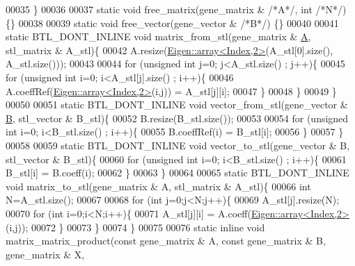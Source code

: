 \begin{DoxyCode}
00035   \}
00036 
00037   \textcolor{keyword}{static} \textcolor{keywordtype}{void} free\_matrix(gene\_matrix & \textcolor{comment}{/*A*/}, \textcolor{keywordtype}{int} \textcolor{comment}{/*N*/}) \{\}
00038 
00039   \textcolor{keyword}{static} \textcolor{keywordtype}{void} free\_vector(gene\_vector & \textcolor{comment}{/*B*/}) \{\}
00040 
00041   \textcolor{keyword}{static} BTL\_DONT\_INLINE \textcolor{keywordtype}{void} matrix\_from\_stl(gene\_matrix & \hyperlink{group___core___module_class_eigen_1_1_matrix}{A}, stl\_matrix & A\_stl)\{
00042     A.resize(\hyperlink{class_eigen_1_1array}{Eigen::array<Index,2>}(A\_stl[0].size(), A\_stl.size()));
00043 
00044     \textcolor{keywordflow}{for} (\textcolor{keywordtype}{unsigned} \textcolor{keywordtype}{int} j=0; j<A\_stl.size() ; j++)\{
00045       \textcolor{keywordflow}{for} (\textcolor{keywordtype}{unsigned} \textcolor{keywordtype}{int} i=0; i<A\_stl[j].size() ; i++)\{
00046         A.coeffRef(\hyperlink{class_eigen_1_1array}{Eigen::array<Index,2>}(i,j)) = A\_stl[j][i];
00047       \}
00048     \}
00049   \}
00050 
00051   \textcolor{keyword}{static} BTL\_DONT\_INLINE  \textcolor{keywordtype}{void} vector\_from\_stl(gene\_vector & \hyperlink{group___core___module_class_eigen_1_1_matrix}{B}, stl\_vector & B\_stl)\{
00052     B.resize(B\_stl.size());
00053 
00054     \textcolor{keywordflow}{for} (\textcolor{keywordtype}{unsigned} \textcolor{keywordtype}{int} i=0; i<B\_stl.size() ; i++)\{
00055       B.coeffRef(i) = B\_stl[i];
00056     \}
00057   \}
00058 
00059   \textcolor{keyword}{static} BTL\_DONT\_INLINE  \textcolor{keywordtype}{void} vector\_to\_stl(gene\_vector & B, stl\_vector & B\_stl)\{
00060     \textcolor{keywordflow}{for} (\textcolor{keywordtype}{unsigned} \textcolor{keywordtype}{int} i=0; i<B\_stl.size() ; i++)\{
00061       B\_stl[i] = B.coeff(i);
00062     \}
00063   \}
00064 
00065   \textcolor{keyword}{static} BTL\_DONT\_INLINE  \textcolor{keywordtype}{void} matrix\_to\_stl(gene\_matrix & A, stl\_matrix & A\_stl)\{
00066     \textcolor{keywordtype}{int}  N=A\_stl.size();
00067 
00068     \textcolor{keywordflow}{for} (\textcolor{keywordtype}{int} j=0;j<N;j++)\{
00069       A\_stl[j].resize(N);
00070       \textcolor{keywordflow}{for} (\textcolor{keywordtype}{int} i=0;i<N;i++)\{
00071         A\_stl[j][i] = A.coeff(\hyperlink{class_eigen_1_1array}{Eigen::array<Index,2>}(i,j));
00072       \}
00073     \}
00074   \}
00075 
00076   \textcolor{keyword}{static} \textcolor{keyword}{inline} \textcolor{keywordtype}{void} matrix\_matrix\_product(\textcolor{keyword}{const} gene\_matrix & A, \textcolor{keyword}{const} gene\_matrix & B, gene\_matrix & X, \textcolor{keywordtype}{
}
\end{DoxyCode}
